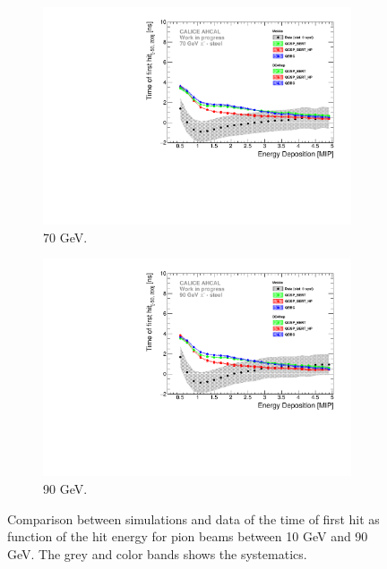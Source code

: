 \begin{figure}[htbp!]
\begin{subfigure}[t]{0.5\textwidth}
    \includegraphics[width=1\textwidth]{../Thesis_Plots/Timing/Pions/Plots/ComparisonToSim/Time_Energy_70GeV.pdf}
    \caption{70 GeV.} \label{fig:Energy_SimData_70GeV}
  \end{subfigure}
  \hfill
  \begin{subfigure}[t]{0.5\textwidth}
    \centering
    \includegraphics[width=1\textwidth]{../Thesis_Plots/Timing/Pions/Plots/ComparisonToSim/Time_Energy_90GeV.pdf}
    \caption{90 GeV.} \label{fig:Energy_SimData_90GeV}
  \end{subfigure}
  \caption{Comparison between simulations and data of the time of first hit as function of the hit energy for pion beams between 10 GeV and 90 GeV. The grey and color bands shows the systematics.}
\end{figure}

